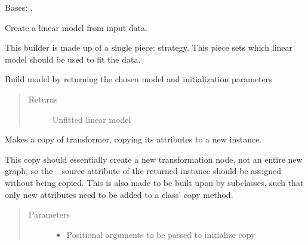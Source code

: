\documentclass[letterpaper,10pt,english]{sphinxmanual}
\begin{document}
\begin{fulllineitems}
\label{\detokenize{dalio.pipe:dalio.pipe.builders.LinearModel}}
Bases: {\hyperref[\detokenize{dalio.pipe:dalio.pipe.pipe.Pipe}]{}}, 

Create a linear model from input data.

This builder is made up of a single piece: strategy. This piece sets
which linear model should be used to fit the data.

\begin{fulllineitems}
\label{\detokenize{dalio.pipe:dalio.pipe.builders.LinearModel.build_model}}
Build model by returning the chosen model and initialization
parameters
\begin{quote}\begin{description}
\item[{Returns}] \leavevmode
Unfitted linear model

\end{description}\end{quote}

\end{fulllineitems}


\begin{fulllineitems}
\label{\detokenize{dalio.pipe:dalio.pipe.builders.LinearModel.copy}}
Makes a copy of transformer, copying its attributes to a new
instance.

This copy should essentially create a new transformation node, not an
entire new graph, so the \_source attribute of the returned instance
should be assigned without being copied. This is also made to be built
upon by subclasses, such that only new attributes need to be added to
a class’ copy method.
\begin{quote}\begin{description}
\item[{Parameters}] \leavevmode\begin{itemize}
\item {} 
 \textendash{} Positional arguments to be passed to initialize copy


\end{itemize}
\end{description}
\end{quote}
\end{fulllineitems}
\end{fulllineitems}
\end{document}
